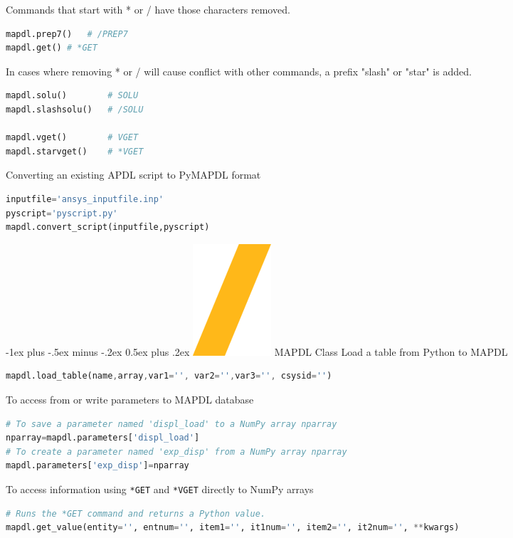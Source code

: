 \documentclass[9pt,landscape]{article}
\makeatletter
\renewcommand{\section}{\@startsection{section}{1}{0mm}%
                                {-1ex plus -.5ex minus -.2ex}%
                                {0.5ex plus .2ex}%
                                {\normalfont\large\bfseries}}
\def\code#1{\texttt{#1}}
\makeatother
\begin{document}
\begin{multicols}{3}
Commands that start with * or / have those characters removed.
\begin{lstlisting}[language=Python]
mapdl.prep7()	# /PREP7
mapdl.get()	# *GET
\end{lstlisting}

In cases where removing * or / will cause conflict with other commands, a prefix "slash" or "star" is added.
\begin{lstlisting}[language=Python]
mapdl.solu()		# SOLU
mapdl.slashsolu()	# /SOLU

mapdl.vget()		# VGET
mapdl.starvget()	# *VGET
\end{lstlisting} 

Converting an existing APDL script to PyMAPDL format
\begin{lstlisting}[language=Python]
inputfile='ansys_inputfile.inp'
pyscript='pyscript.py'
mapdl.convert_script(inputfile,pyscript)
\end{lstlisting}
\columnbreak

\section{\includegraphics[height=\fontcharht\font`\S]{slash.png} MAPDL Class}
Load a table from Python to MAPDL
\begin{lstlisting}[language=Octave]
mapdl.load_table(name,array,var1='', var2='',var3='', csysid='')
\end{lstlisting}
To access from or write parameters to MAPDL database
\begin{lstlisting}[language=Python]
# To save a parameter named 'displ_load' to a NumPy array nparray
nparray=mapdl.parameters['displ_load']
# To create a parameter named 'exp_disp' from a NumPy array nparray
mapdl.parameters['exp_disp']=nparray
\end{lstlisting}

To access information using \code{*GET} and \code{*VGET} directly to NumPy arrays
\begin{lstlisting}[language=Python]
# Runs the *GET command and returns a Python value.
mapdl.get_value(entity='', entnum='', item1='', it1num='', item2='', it2num='', **kwargs)


\end{lstlisting}
\end{multicols}
\end{document}
